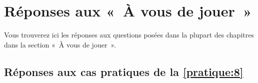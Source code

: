 

\chapter{Réponses aux «~À vous de jouer~»\label{annexe:reponses}}


Vous trouverez ici les réponses aux questions posées dans la plupart des chapitres dans la section «~À vous de jouer~». 

\section{Réponses aux cas pratiques de la \autoref{pratique:8}\label{reponses:8}}
